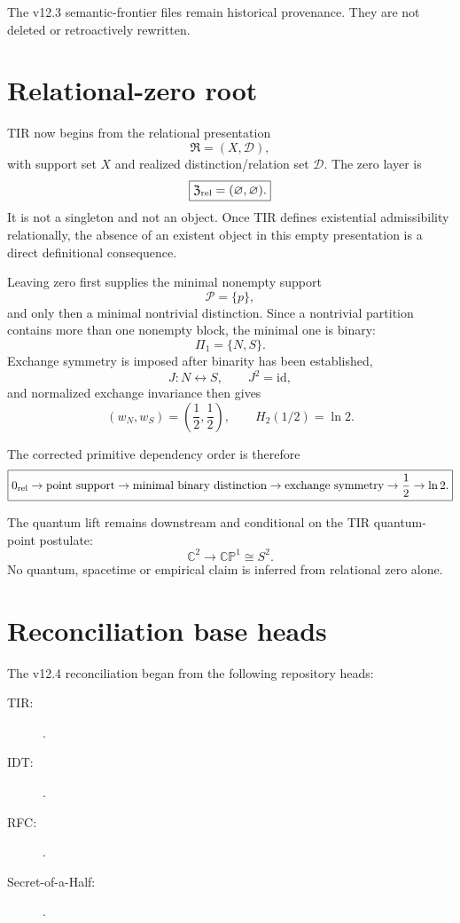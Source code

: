 The v12.3 semantic-frontier files remain historical provenance. They are not deleted or
retroactively rewritten.

\section{Relational-zero root}

TIR now begins from the relational presentation
\[
\mathfrak R=(X,\mathcal D),
\]
with support set $X$ and realized distinction/relation set $\mathcal D$. The zero layer is
\[
\boxed{
\mathfrak Z_{\rm rel}=(\varnothing,\varnothing).
}
\]
It is not a singleton and not an object. Once TIR defines existential admissibility
relationally, the absence of an existent object in this empty presentation is a direct
definitional consequence.

Leaving zero first supplies the minimal nonempty support
\[
\boxed{\mathcal P=\{p\}},
\]
and only then a minimal nontrivial distinction. Since a nontrivial partition contains
more than one nonempty block, the minimal one is binary:
\[
\boxed{\Pi_1=\{N,S\}}.
\]
Exchange symmetry is imposed after binarity has been established,
\[
J:N\leftrightarrow S,\qquad J^2=\mathrm{id},
\]
and normalized exchange invariance then gives
\[
\boxed{(w_N,w_S)=\left(\frac12,\frac12\right)},
\qquad
\boxed{H_2(1/2)=\ln2}.
\]

The corrected primitive dependency order is therefore
\[
\boxed{
0_{\rm rel}
\to
\text{point support}
\to
\text{minimal binary distinction}
\to
\text{exchange symmetry}
\to
\frac12
\to
\ln2.
}
\]

The quantum lift remains downstream and conditional on the TIR quantum-point postulate:
\[
\mathbb C^2\to\mathbb{CP}^1\cong S^2.
\]
No quantum, spacetime or empirical claim is inferred from relational zero alone.

\section{Reconciliation base heads}

The v12.4 reconciliation began from the following repository heads:

\begin{description}
\item[TIR:] .
\item[IDT:] .
\item[RFC:] .
\item[Secret-of-a-Half:] .
\end{description}

